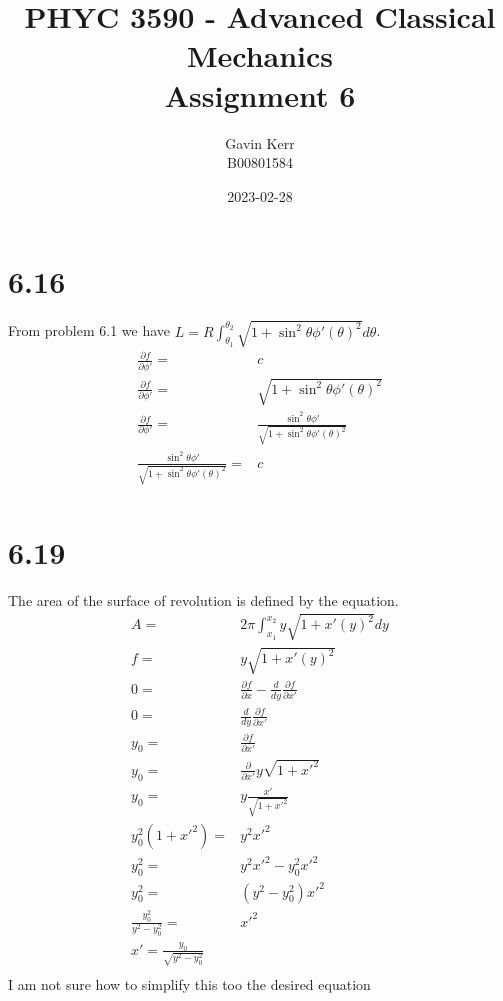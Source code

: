 \documentclass[12pt, a4paper]{article}
\title{PHYC 3590 - Advanced Classical Mechanics\\Assignment 6}
\author{Gavin Kerr\\B00801584}
\date{2023-02-28}
\begin{document}
\maketitle

\section{6.16}
From problem 6.1 we have $L = R\int_{\theta_1}^{\theta_2}\sqrt{1+\sin^2\theta\phi'(\theta)^2}d\theta$.
\begin{align*}
\frac{\partial f}{\partial\phi'} =& c
\\
\frac{\partial f}{\partial\phi'} =& \sqrt{1+\sin^2\theta\phi'(\theta)^2}
\\
\frac{\partial f}{\partial\phi'} =& \frac{\sin^2\theta\phi'}{\sqrt{1+\sin^2\theta\phi'(\theta)^2}}
\\
\frac{\sin^2\theta\phi'}{\sqrt{1+\sin^2\theta\phi'(\theta)^2}} =& c
\\
\end{align*}


\section{6.19}
The area of the surface of revolution is defined by the equation. 
\begin{align*}
A =& 2\pi \int_{x_1}^{x_2}y\sqrt{1+x'(y)^2}dy
\\
f =& y\sqrt{1+x'(y)^2}
\\
0 =& {\frac {\partial f}{\partial x}}-{\frac{d }{d y}}{\frac {\partial f}{\partial x'}}
\\
0 =& \frac{d}{dy}\frac{\partial f}{\partial x'}
\\
y_0 =& \frac{\partial f}{\partial x'}
\\
y_0 =& \frac{\partial }{\partial x'}y\sqrt{1+x'^2}
\\
y_0 =& y\frac{x'}{\sqrt{1+x'^2}}
\\
y_0^2(1+x'^2) =& y^2x'^2
\\
y_0^2 =& y^2x'^2 - y_0^2x'^2
\\
y_0^2 =& (y^2 - y_0^2)x'^2
\\
\frac{y_0^2}{y^2 - y_0^2} =& x'^2
\\
x' = \frac{y_0}{\sqrt{y^2 - y_0^2}}
\\
\end{align*}
I am not sure how to simplify this too the desired equation


\pagebreak
\end{document}
